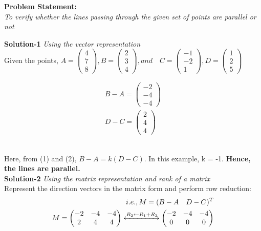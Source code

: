 \documentclass[a4paper,12pt]{article}
\begin{document}
\begin{flushleft}	
\textbf{Problem Statement:} \\
\textit{To verify whether the lines passing through the given set of points are parallel or not} \vspace{5mm}

\textbf{Solution-1}
\textit{Using the vector representation} \\
Given the points, $A = \begin{pmatrix} 4\\	7\\	8\end{pmatrix}, 
                   B = \begin{pmatrix} 2\\ 3\\ 4 \end{pmatrix}, and \quad
                   C = \begin{pmatrix} -1\\ -2\\ 1 \end{pmatrix}, 
                   D = \begin{pmatrix} 1\\ 2\\ 5 \end{pmatrix} $


\begin{align}
B-A = \begin{pmatrix} -2\\ -4\\ -4 \end{pmatrix}   \\
D-C = \begin{pmatrix}  2\\  4\\  4 \end{pmatrix}  
\end{align}

\\
Here, from (1) and (2), $B-A = k (D-C)$. In this example, k = -1.
\textbf{Hence, the lines are parallel.}\\
\vspace{5mm}
\textbf{Solution-2} \textit{Using the matrix representation and rank of a matrix}\\
Represent the direction vectors in the matrix form and perform row reduction: 
\begin{align*}
i.e., M = (B-A \quad D-C)^T \\
M = \begin{pmatrix}
	-2 & -4 & -4\\
	 2 &  4 &  4
    \end{pmatrix}
\xleftrightarrow{R_2 \leftarrow R_1+R_2}
\begin{pmatrix}
	-2 & -4 & -4\\
	 0 &  0 &  0
\end{pmatrix}
\end{align*}


\end{flushleft}
\end{document}

